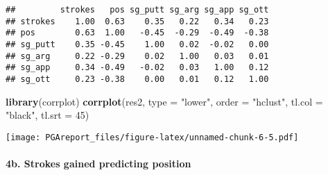 \documentclass[
]{article}
\newenvironment{Shaded}{\begin{snugshade}}{\end{snugshade}}
\newcommand{\DataTypeTok}[1]{\textcolor[rgb]{0.13,0.29,0.53}{#1}}
\newcommand{\DecValTok}[1]{\textcolor[rgb]{0.00,0.00,0.81}{#1}}
\newcommand{\KeywordTok}[1]{\textcolor[rgb]{0.13,0.29,0.53}{\textbf{#1}}}
\newcommand{\NormalTok}[1]{#1}
\newcommand{\OperatorTok}[1]{\textcolor[rgb]{0.81,0.36,0.00}{\textbf{#1}}}
\newcommand{\StringTok}[1]{\textcolor[rgb]{0.31,0.60,0.02}{#1}}
\begin{document}
\begin{verbatim}
##         strokes   pos sg_putt sg_arg sg_app sg_ott
## strokes    1.00  0.63    0.35   0.22   0.34   0.23
## pos        0.63  1.00   -0.45  -0.29  -0.49  -0.38
## sg_putt    0.35 -0.45    1.00   0.02  -0.02   0.00
## sg_arg     0.22 -0.29    0.02   1.00   0.03   0.01
## sg_app     0.34 -0.49   -0.02   0.03   1.00   0.12
## sg_ott     0.23 -0.38    0.00   0.01   0.12   1.00
\end{verbatim}

\begin{Shaded}
\begin{Highlighting}[]
\KeywordTok{library}\NormalTok{(corrplot)}
\KeywordTok{corrplot}\NormalTok{(res2, }\DataTypeTok{type =} \StringTok{"lower"}\NormalTok{, }\DataTypeTok{order =} \StringTok{"hclust"}\NormalTok{, }
         \DataTypeTok{tl.col =} \StringTok{"black"}\NormalTok{, }\DataTypeTok{tl.srt =} \DecValTok{45}\NormalTok{)}
\end{Highlighting}
\end{Shaded}

\texttt{[image: PGAreport\_files/figure-latex/unnamed-chunk-6-5.pdf]}

\hypertarget{b.-strokes-gained-predicting-position}{%
\paragraph{4b. Strokes gained predicting
position}\label{b.-strokes-gained-predicting-position}}

\begin{Shaded}
\end{Shaded}
\end{document}

